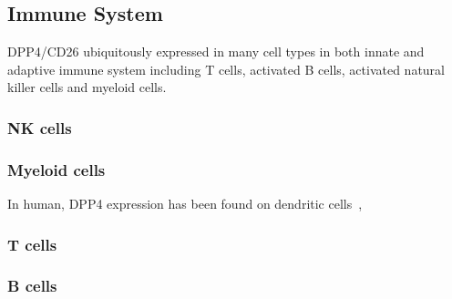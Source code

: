 \subsection{Immune System}
DPP4/CD26 ubiquitously expressed in many cell types in both innate and adaptive immune system including T cells, activated B cells, activated natural killer cells and myeloid cells.~\cite{Abbott1994,Shingu2003,Hong1989,Gutschmidt1981,Dikov2004,Bühling1995,Tanaka1992,Gorrell1991}  

\subsubsection{NK cells}

\subsubsection{Myeloid cells}
In human, DPP4 expression has been found on dendritic cells~\cite{Zhong2013,Gliddon2002,Epardaud2004}, 

\subsubsection{T cells}
\subsubsection{B cells}

